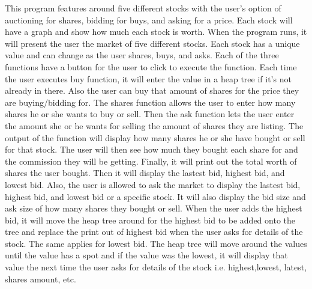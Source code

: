 This program features around five different stocks with the user's option of auctioning for shares, bidding for buys, and asking for a price. Each stock will have a graph and show how much each stock is worth. When the program runs, it will present the user the market of five different stocks. Each stock has a unique value and can change as the user shares, buys, and asks. Each of the three functions have a button for the user to click to execute the function. Each time the user executes buy function, it will enter the value in a heap tree if it's not already in there. Also the user can buy that amount of shares for the price they are buying/bidding for. The shares function allows the user to enter how many shares he or she wants to buy or sell. Then the ask function lets the user enter the amount she or he wants for selling the amount of shares they are listing. The output of the function will display how many shares he or she have bought or sell for that stock. The user will then see how much they bought each share for and the commission they will be getting. Finally, it will print out the total worth of shares the user bought. Then it will display the lastest bid, highest bid, and lowest bid. Also, the user is allowed to ask the market to display the lastest bid, highest bid, and lowest bid or a specific stock. It will also display the bid size and ask size of how many shares they bought or sell. When the user adds the highest bid, it will move the heap tree around for the highest bid to be added onto the tree and replace the print out of highest bid when the user asks for details of the stock. The same applies for lowest bid. The heap tree will move around the values until the value has a spot and if the value was the lowest, it will display that value the next time the user asks for details of the stock i.\+e. highest,lowest, latest, shares amount, etc. 